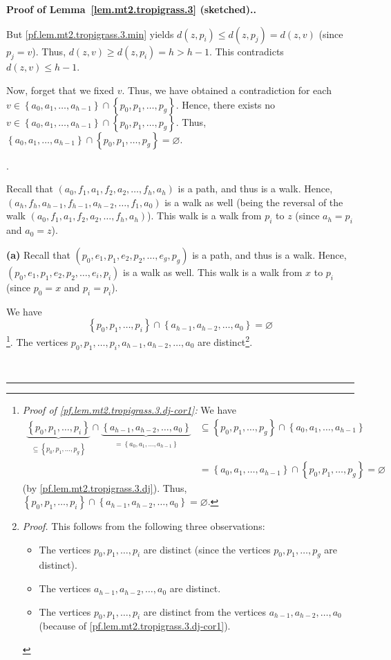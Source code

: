 \documentclass[numbers=enddot,12pt,final,onecolumn,notitlepage]{scrartcl}%
\theoremstyle{definition}
\newenvironment{proof}[1][Proof]{\noindent\textbf{#1.} }{\ \rule{0.5em}{0.5em}}
\newcommand{\set}[1]{\left\{ #1 \right\}}
\newcommand{\tup}[1]{\left( #1 \right)}
\newcommand{\underbrack}[2]{\underbrace{#1}_{\substack{#2}}}
\begin{document}
\begin{proof}[Proof of Lemma~\ref{lem.mt2.tropigrass.3} (sketched).]
{    But \eqref{pf.lem.mt2.tropigrass.3.min} yields
    $d \tup{z, p_i} \leq d \tup{z, p_j} = d \tup{z, v}$
    (since $p_j = v$). Thus, $d \tup{z, v} \geq d \tup{z, p_i}
    = h > h-1$. This contradicts $d \tup{z, v} \leq h-1$.

    Now, forget that we fixed $v$. Thus, we have obtained a
    contradiction for each
    $v \in
    \set{a_0, a_1, \ldots, a_{h-1}} \cap \set{p_0, p_1, \ldots, p_g}$.
    Hence, there exists no
    $v \in
    \set{a_0, a_1, \ldots, a_{h-1}} \cap \set{p_0, p_1, \ldots, p_g}$.
    Thus,
    $\set{a_0, a_1, \ldots, a_{h-1}} \cap \set{p_0, p_1, \ldots, p_g}
    = \varnothing$.}.

Recall that $\tup{a_0, f_1, a_1, f_2, a_2, \ldots, f_h, a_h}$
is a path, and thus is a walk.
Hence,
$\tup{a_h, f_h, a_{h-1}, f_{h-1}, a_{h-2}, \ldots, f_1, a_0}$
is a walk as well (being the reversal of the walk
$\tup{a_0, f_1, a_1, f_2, a_2, \ldots, f_h, a_h}$).
This walk is a walk from $p_i$ to $z$ (since $a_h = p_i$ and
$a_0 = z$).

\textbf{(a)} Recall that
$\tup{p_0, e_1, p_1, e_2, p_2, \ldots, e_g, p_g}$ is a path,
and thus is a walk.
Hence,
$\tup{p_0, e_1, p_1, e_2, p_2, \ldots, e_i, p_i}$ is a walk
as well.
This walk is a walk from $x$ to $p_i$ (since $p_0 = x$ and
$p_i = p_i$).

We have
\begin{equation}
\set{p_0, p_1, \ldots, p_i} \cap \set{a_{h-1}, a_{h-2}, \ldots, a_0}
= \varnothing
\label{pf.lem.mt2.tropigrass.3.dj-cor1}
\end{equation}
\footnote{\textit{Proof of \eqref{pf.lem.mt2.tropigrass.3.dj-cor1}:}
  We have
  \begin{align*}
  \underbrack{\set{p_0, p_1, \ldots, p_i}}
             {\subseteq \set{p_0, p_1, \ldots, p_g}}
  \cap
  \underbrack{\set{a_{h-1}, a_{h-2}, \ldots, a_0}}
             {= \set{a_0, a_1, \ldots, a_{h-1}}}
  & \subseteq
  \set{p_0, p_1, \ldots, p_g} \cap \set{a_0, a_1, \ldots, a_{h-1}}
  \\
  &= \set{a_0, a_1, \ldots, a_{h-1}} \cap \set{p_0, p_1, \ldots, p_g}
  = \varnothing
  \end{align*}
  (by \eqref{pf.lem.mt2.tropigrass.3.dj}).
  Thus,
  $\set{p_0, p_1, \ldots, p_i} \cap \set{a_{h-1}, a_{h-2}, \ldots, a_0}
  = \varnothing$. }.
The vertices
$p_0, p_1, \ldots, p_i, a_{h-1}, a_{h-2}, \ldots, a_0$
are distinct\footnote{\textit{Proof.}
  This follows from the following three observations:
  \begin{itemize}
  \item The vertices $p_0, p_1, \ldots, p_i$ are distinct
        (since the vertices $p_0, p_1, \ldots, p_g$ are
        distinct).
  \item The vertices $a_{h-1}, a_{h-2}, \ldots, a_0$ are
        distinct.
  \item The vertices $p_0, p_1, \ldots, p_i$ are distinct
        from the vertices $a_{h-1}, a_{h-2}, \ldots, a_0$
        (because of \eqref{pf.lem.mt2.tropigrass.3.dj-cor1}).
  \end{itemize}
  }.


\end{proof}
\end{document}
